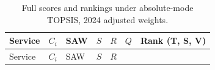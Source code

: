 \documentclass[
  12pt,
  letterpaper,
  12pt,
  oneside,
  english,
  onehalfspacing,
  headsepline]{MastersDoctoralThesis}
\begin{document}
\begin{longtable}[]{@{}
  >{\raggedright\arraybackslash}p{}
  >{\raggedleft\arraybackslash}p{}
  >{\raggedleft\arraybackslash}p{}
  >{\raggedleft\arraybackslash}p{}
  >{\raggedleft\arraybackslash}p{}
  >{\raggedleft\arraybackslash}p{}
  >{\centering\arraybackslash}p{}@{}}
\caption{Full scores and rankings under absolute-mode TOPSIS, 2024
adjusted weights.}\label{tbl-appc-2024a-abs}\tabularnewline
\toprule\noalign{}
\begin{minipage}[b]{\linewidth}\raggedright
Service
\end{minipage} & \begin{minipage}[b]{\linewidth}\raggedleft
\(C_i\)
\end{minipage} & \begin{minipage}[b]{\linewidth}\raggedleft
SAW
\end{minipage} & \begin{minipage}[b]{\linewidth}\raggedleft
\(S\)
\end{minipage} & \begin{minipage}[b]{\linewidth}\raggedleft
\(R\)
\end{minipage} & \begin{minipage}[b]{\linewidth}\raggedleft
\(Q\)
\end{minipage} & \begin{minipage}[b]{\linewidth}\centering
Rank (T, S, V)
\end{minipage} \\
\midrule\noalign{}
\endfirsthead
\toprule\noalign{}
\begin{minipage}[b]{\linewidth}\raggedright
Service
\end{minipage} & \begin{minipage}[b]{\linewidth}\raggedleft
\(C_i\)
\end{minipage} & \begin{minipage}[b]{\linewidth}\raggedleft
SAW
\end{minipage} & \begin{minipage}[b]{\linewidth}\raggedleft
\(S\)
\end{minipage} & \begin{minipage}[b]{\linewidth}\raggedleft
\(R\)
\end{minipage} & \begin{minipage}[b]{\linewidth}\raggedleft

\end{minipage}
\end{longtable}
\end{document}
